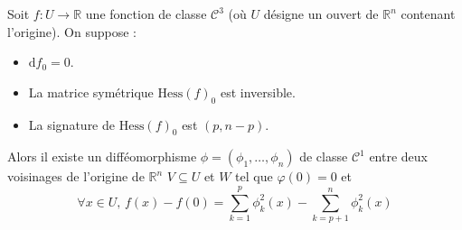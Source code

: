   \begin{lemma}
    \label{lemme-de-morse-2}
    Soit $f : U \rightarrow \mathbb{R}$ une fonction de classe $\mathcal{C}^3$ (où $U$ désigne un ouvert de $\mathbb{R}^n$ contenant l'origine). On suppose :
    \begin{itemize}
      \item $\mathrm{d} f_0 = 0$.
      \item La matrice symétrique $\mathrm{Hess} (f)_0$ est inversible.
      \item La signature de $\mathrm{Hess}(f)_0$ est $(p, n-p)$.
    \end{itemize}
    Alors il existe un difféomorphisme $\phi = (\phi_1, \dots, \phi_n)$ de classe $\mathcal{C}^1$ entre deux voisinages de l'origine de $\mathbb{R}^n$ $V \subseteq U$ et $W$ tel que $\varphi(0) = 0$ et
    \[ \forall x \in U, \, f(x) - f(0) = \sum_{k=1}^p \phi_k^2(x) - \sum_{k=p+1}^n \phi_k^2(x) \]
  \end{lemma}

